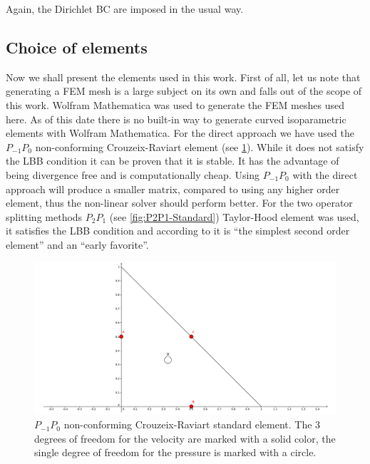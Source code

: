 Again, the Dirichlet BC are imposed in the usual way.

\subsection{Choice of elements}

Now we shall present the elements used in this work. First of all, let us note that generating a FEM mesh is a large subject on its own and falls out of the scope of this work. Wolfram Mathematica was used to generate the FEM meshes used here. As of this date there is no built-in way to generate curved isoparametric elements with Wolfram Mathematica. For the direct approach we have used the $P_{-1}P_0$ non-conforming Crouzeix-Raviart element (see \cref{fig:P1P0-CR-Standard}). While it does not satisfy the LBB condition it can be proven \cite{Larson-Bengzon} that it is stable. It has the advantage of being divergence free and is computationally cheap. Using $P_{-1}P_0$ with the direct approach will produce a smaller matrix, compared to using any higher order element, thus the non-linear solver should perform better. For the two operator splitting methods $P_2P_1$ (see \cref{fig:P2P1-Standard}) Taylor-Hood element was used, it satisfies the LBB condition and according to \cite{gresho-fem} it is ``the simplest second order element'' and an ``early favorite''.

\begin{figure}[H]
  \centering
  \includegraphics[width=\textwidth]{Figures/01_introduction/cr_element.pdf}
  \caption{$P_{-1}P_0$ non-conforming Crouzeix-Raviart standard element. The 3 degrees of freedom for the velocity are marked with a solid color, the single degree of freedom for the pressure is marked with a circle.}\label{fig:P1P0-CR-Standard}
\end{figure}

